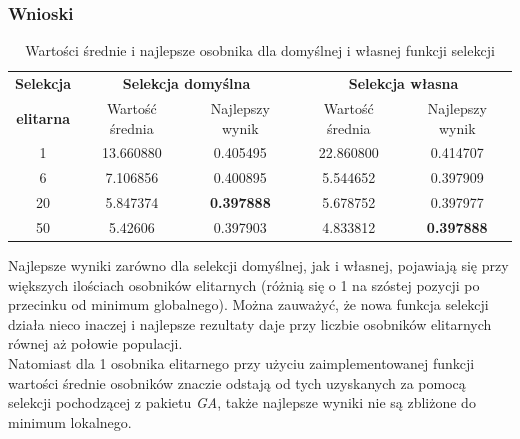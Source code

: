 \subsubsection{Wnioski}

\begin{table}[!h]
	\centering
	\caption{Wartości średnie i najlepsze osobnika dla domyślnej i własnej funkcji selekcji}
	\label{sel_porownanie}
	\begin{tabular}{|c|c|c|c|c|}
		\hline
		\textbf{Selekcja} & \multicolumn{2}{c}{\textbf{Selekcja domyślna}}  & \multicolumn{2}{|c|}{\textbf{Selekcja własna}} \\ \cline{2-5}
		\textbf{elitarna} & Wartość średnia & Najlepszy wynik & Wartość średnia & Najlepszy wynik \\ \hline
		
		1  & 13.660880  & 0.405495 & 22.860800 & 0.414707 \\
		6  & 7.106856 & 0.400895 & 5.544652 & 0.397909 \\
		20 & 5.847374 & \textbf{{\color{green} 0.397888 }} & 5.678752 & 0.397977 \\
		50 & 5.42606 & 0.397903 & 4.833812 & \textbf{{\color{green} 0.397888 }} \\ \hline      
	\end{tabular}
\end{table}

Najlepsze wyniki zarówno dla selekcji domyślnej, jak i własnej, pojawiają się przy większych ilościach osobników elitarnych (różnią się o 1 na szóstej pozycji po przecinku od minimum globalnego). Można zauważyć, że nowa funkcja selekcji działa nieco inaczej i najlepsze rezultaty daje przy liczbie osobników elitarnych równej aż połowie populacji.\\
Natomiast dla 1 osobnika elitarnego przy użyciu zaimplementowanej funkcji wartości średnie osobników znaczie odstają od tych uzyskanych za pomocą selekcji pochodzącej z pakietu \textit{GA}, także najlepsze wyniki nie są zbliżone do minimum lokalnego.